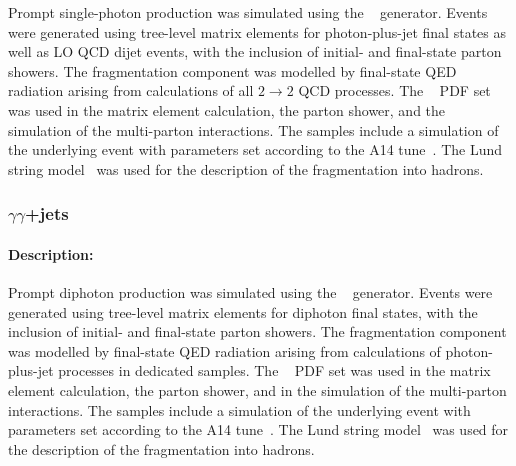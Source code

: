 Prompt single-photon production was simulated using the \PYTHIA[8.186]~\cite{Sjostrand:2007gs} generator. 
Events were generated using tree-level matrix elements for photon-plus-jet final
states as well as LO QCD dijet events, with the inclusion of initial-
and final-state parton showers. The fragmentation component was
modelled by final-state QED radiation arising from calculations of all
$2\rightarrow 2$ QCD processes. The \NNPDF[2.3lo]~\cite{Ball:2012cx} PDF
set was used in the matrix element calculation, the parton shower, and
the simulation of the multi-parton interactions. The samples
include a simulation of the underlying event with parameters set
according to the A14 tune~\cite{ATL-PHYS-PUB-2014-021}. The Lund
string model~\cite{Andersson:1983ia,Sjostrand:1984ic} was used for the
description of the fragmentation into hadrons.


\subsubsection[yy+jets]{ $\gamma\gamma$+jets}

\paragraph{Description:}

Prompt diphoton production was simulated using the 
\PYTHIA[8.186]~\cite{Sjostrand:2007gs} generator. Events were 
generated using tree-level matrix elements for diphoton final states,
with the inclusion of initial- and final-state parton showers.  The
fragmentation component was modelled by final-state QED radiation
arising from calculations of photon-plus-jet processes in dedicated
samples. The \NNPDF[2.3lo]~\cite{Ball:2012cx} PDF set was used in the
matrix element calculation, the parton shower, and in the simulation of the
multi-parton interactions. The samples include a simulation of the
underlying event with parameters set according to the A14
tune~\cite{ATL-PHYS-PUB-2014-021}. The Lund string
model~\cite{Andersson:1983ia,Sjostrand:1984ic} was used for the
description of the fragmentation into hadrons.
